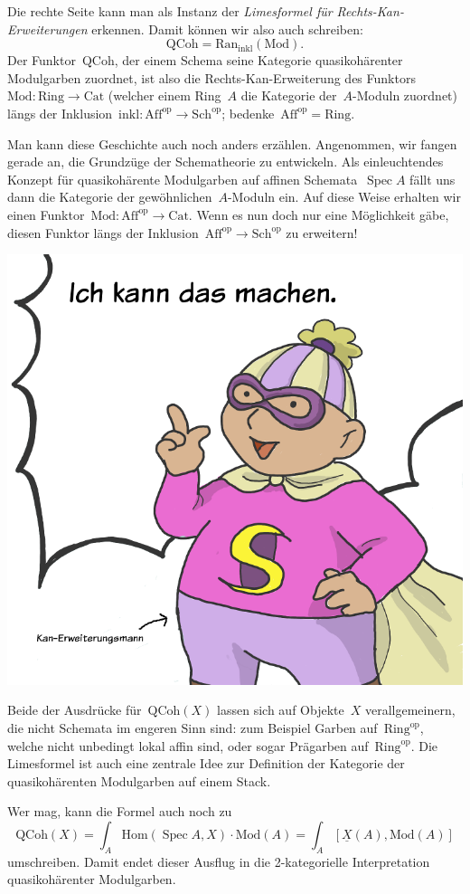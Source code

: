 \documentclass[a4paper,ngerman,12pt]{scrartcl}
\theoremstyle{definition}
\theoremstyle{plain}
\theoremstyle{remark}
\newcommand{\op}{\mathrm{op}}
\newcommand{\Hom}{\mathrm{Hom}}
\newcommand{\ul}[1]{\underline{#1}}
\DeclareMathOperator{\Spec}{Spec}
\begin{document}
Die rechte Seite kann man als Instanz der \emph{Limesformel für
Rechts-Kan-Erweiterungen} erkennen. Damit können wir also auch schreiben:
\[ \mathrm{QCoh} = \mathrm{Ran}_\mathrm{inkl}(\mathrm{Mod}). \]
Der Funktor~$\mathrm{QCoh}$, der einem Schema seine Kategorie quasikohärenter
Modulgarben zuordnet, ist also die Rechts-Kan-Erweiterung des
Funktors~$\mathrm{Mod} : \mathrm{Ring} \to \mathrm{Cat}$ (welcher einem
Ring~$A$ die Kategorie der~$A$-Moduln zuordnet) längs der
Inklusion~$\mathrm{inkl} : \mathrm{Aff}^\op \to \mathrm{Sch}^\op$;
bedenke~$\mathrm{Aff}^\op = \mathrm{Ring}$.

Man kann diese Geschichte auch noch anders erzählen. Angenommen, wir fangen
gerade an, die Grundzüge der Schematheorie zu entwickeln. Als einleuchtendes
Konzept für quasikohärente Modulgarben auf affinen Schemata~$\Spec A$ fällt uns
dann die Kategorie der gewöhnlichen~$A$-Moduln ein. Auf diese Weise erhalten
wir einen Funktor~$\mathrm{Mod} : \mathrm{Aff}^\op \to \mathrm{Cat}$. Wenn es
nun doch nur eine Möglichkeit gäbe, diesen Funktor längs der
Inklusion~$\mathrm{Aff}^\op \to \mathrm{Sch}^\op$ zu erweitern!

\begin{center}
\includegraphics[scale=0.28]{kan-erweiterungsmann}
\end{center}

Beide der Ausdrücke für~$\mathrm{QCoh}(X)$ lassen sich auf Objekte~$X$
verallgemeinern, die nicht Schemata im engeren Sinn sind: zum Beispiel Garben
auf~$\mathrm{Ring}^\op$, welche nicht unbedingt lokal affin sind, oder sogar
Prägarben auf~$\mathrm{Ring}^\op$. Die Limesformel ist auch eine zentrale Idee
zur Definition der Kategorie der quasikohärenten Modulgarben auf einem Stack.

Wer mag, kann die Formel auch noch zu
\[ \mathrm{QCoh}(X) = \int_A \Hom(\Spec A, X) \cdot \mathrm{Mod}(A) =
  \int_A [\ul{X}(A), \mathrm{Mod}(A)] \]
umschreiben. Damit endet dieser Ausflug in die 2-kategorielle Interpretation
quasikohärenter Modulgarben.
\end{document}
